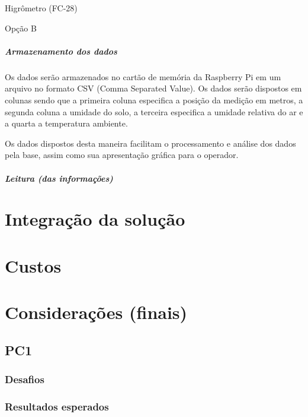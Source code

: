 Higrômetro (FC-28)

Opção B

\paragraph{Armazenamento dos dados}

Os dados serão armazenados no cartão de memória da Raspberry Pi em um arquivo no formato CSV (Comma Separated Value). Os dados serão dispostos em colunas sendo que a primeira coluna especifica a posição da medição em metros, a segunda coluna a umidade do solo, a terceira especifica a umidade relativa do ar e a quarta a temperatura ambiente.

Os dados dispostos desta maneira facilitam o processamento e análise dos dados pela base, assim como sua apresentação gráfica para o operador.

\paragraph{Leitura (das informações)}


\chapter[Integração da solução]{Integração da solução}

\chapter[Custos]{Custos}

\chapter[Considerações finais]{Considerações (finais)}

\section{PC1}

\subsection{Desafios}

\subsection{Resultados esperados}